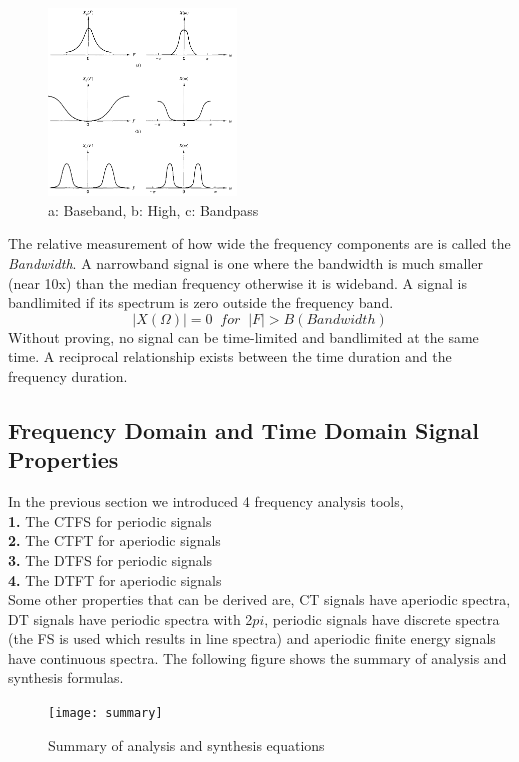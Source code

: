 \documentclass{article} %
\begin{document}
	\begin{figure}[h]
	\centering
	\includegraphics[width=5cm]{band}
	\caption{a: Baseband, b: High, c: Bandpass}
	\end{figure}
	The relative measurement of how wide the frequency components are is called the \textit{Bandwidth}. A narrowband signal is one
	where the bandwidth is much smaller (near 10x) than the median frequency otherwise it is wideband. A signal is bandlimited if its spectrum is zero outside
	the frequency band. 
	\begin{equation}
	|X(\Omega)| = 0 \;\; for \;\;|F| > B (Bandwidth)
	\end{equation}
	Without proving, no signal can be time-limited and bandlimited at the same time. A reciprocal relationship exists between the time 
	duration and the frequency duration. 

	\subsection{Frequency Domain and Time Domain Signal Properties}
	In the previous section we introduced 4 frequency analysis tools,\\
	\textbf{1.} The CTFS for periodic signals\\
	\textbf{2.} The CTFT for aperiodic signals\\
	\textbf{3.} The DTFS for periodic signals\\
	\textbf{4.} The DTFT for aperiodic signals\\
	Some other properties that can be derived are, CT signals have aperiodic spectra, DT signals have periodic spectra with 2$pi$, 
	periodic signals have discrete spectra (the FS is used which results in line spectra) and aperiodic finite energy signals have 
	continuous spectra. The following figure shows the summary of analysis and synthesis formulas. 
	\begin{figure}[h]
	\centering
	\texttt{[image: summary]}
	\caption{Summary of analysis and synthesis equations}
	\end{figure}
\end{document}
